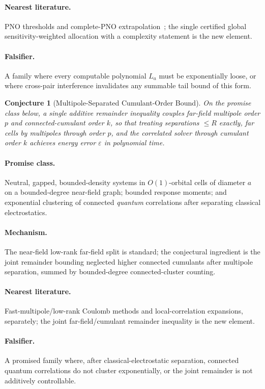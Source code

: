 \documentclass[11pt]{article}
\newtheorem{conjecture}{Conjecture}
\theoremstyle{definition}
\newcommand{\eps}{\varepsilon}
\begin{document}
\paragraph{Nearest literature.}  PNO thresholds and complete-PNO
extrapolation~\cite{R20}; the single certified global sensitivity-weighted
allocation with a complexity statement is the new element.
\paragraph{Falsifier.}  A family where every computable polynomial $L_a$ must be
exponentially loose, or where cross-pair interference invalidates any summable
tail bound of this form.

\begin{conjecture}[Multipole-Separated Cumulant-Order Bound]\label{p11}
On the promise class below, a single additive remainder inequality couples
far-field multipole order $p$ and connected-cumulant order $k$, so that treating
separations $\le R$ exactly, far cells by multipoles through order $p$, and the
correlated solver through cumulant order $k$ achieves energy error $\eps$ in
polynomial time.
\end{conjecture}
\paragraph{Promise class.}  Neutral, gapped, bounded-density systems in
$O(1)$-orbital cells of diameter $a$ on a bounded-degree near-field graph;
bounded response moments; and exponential clustering of connected \emph{quantum}
correlations after separating classical electrostatics.
\paragraph{Mechanism.}  The near-field low-rank far-field split is standard; the
conjectural ingredient is the joint remainder bounding neglected higher connected
cumulants after multipole separation, summed by bounded-degree connected-cluster
counting.
\paragraph{Nearest literature.}  Fast-multipole/low-rank Coulomb methods and
local-correlation expansions, separately; the joint far-field/cumulant remainder
inequality is the new element.
\paragraph{Falsifier.}  A promised family where, after classical-electrostatic
separation, connected quantum correlations do not cluster exponentially, or the
joint remainder is not additively controllable.
\end{document}
